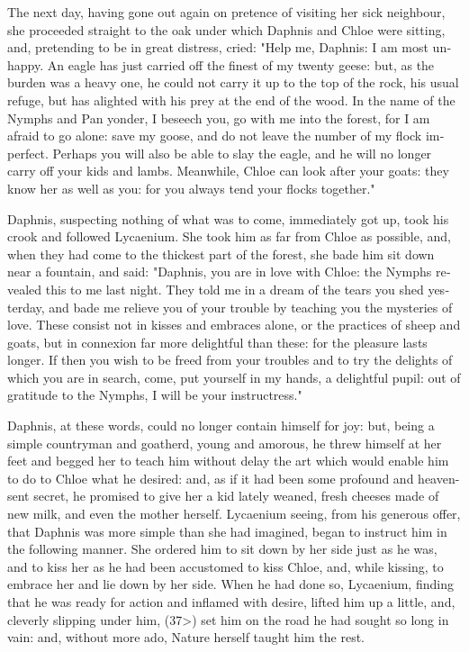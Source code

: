 \documentclass{book}
\begin{document}
\begin{pairs}
\begin{Rightside}
\begin{english}
  The next day, having gone out again on pretence of visiting her sick neighbour, she proceeded straight to the oak under which Daphnis and Chloe were sitting, and, pretending to be in great distress, cried: "Help me, Daphnis: I am most unhappy.  An eagle has just carried off the finest of my twenty geese: but, as the burden was a heavy one, he could not carry it up to the top of the rock, his usual refuge, but has alighted with his prey at the end of the wood.  In the name of the Nymphs and Pan yonder, I beseech you, go with me into the forest, for I am afraid to go alone: save my goose, and do not leave the number of my flock imperfect.  Perhaps you will also be able to slay the eagle, and he will no longer carry off your kids and lambs.  Meanwhile, Chloe can look after your goats: they know her as well as you: for you always tend your flocks together."
\pend


  Daphnis, suspecting nothing of what was to come, immediately got up, took his crook and followed Lycaenium.  She took him as far from Chloe as possible, and, when they had come to the thickest part of the forest, she bade him sit down near a fountain, and said: "Daphnis, you are in love with Chloe: the Nymphs revealed this to me last night.  They told me in a dream of the tears you shed yesterday, and bade me relieve you of your trouble by teaching you the mysteries of love.  These consist not in kisses and embraces alone, or the practices of sheep and goats, but in connexion far more delightful than these: for the pleasure lasts longer.  If then you wish to be freed from your troubles and to try the delights of which you are in search, come, put yourself in my hands, a delightful pupil: out of gratitude to the Nymphs, I will be your instructress."
\pend


  Daphnis, at these words, could no longer contain himself for joy: but, being a simple countryman and goatherd, young and amorous, he threw himself at her feet and begged her to teach him without delay the art which would enable him to do to Chloe what he desired: and, as if it had been some profound and heaven-sent secret, he promised to give her a kid lately weaned, fresh cheeses made of new milk, and even the mother herself.  Lycaenium seeing, from his generous offer, that Daphnis was more simple than she had imagined, began to instruct him in the following manner.  She ordered him to sit down by her side just as he was, and to kiss her as he had been accustomed to kiss Chloe, and, while kissing, to embrace her and lie down by her side.  When he had done so, Lycaenium, finding that he was ready for action and inflamed with desire, lifted him up a little, and, cleverly slipping under him, (37>) set him on the road he had sought so long in vain: and, without more ado, Nature herself taught him the rest.
\pend



\end{english}
\end{Rightside}
\end{pairs}
\end{document}
